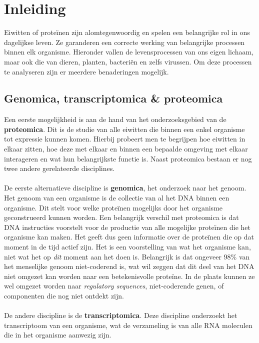 \chapter{Inleiding}\label{ch:introductie}

Eiwitten of proteïnen zijn alomtegenwoordig en spelen een belangrijke rol in ons dagelijkse leven.
Ze garanderen een correcte werking van belangrijke processen binnen elk organisme.
Hieronder vallen de levensprocessen van ons eigen lichaam, maar ook die van dieren, planten, bacteriën en zelfs virussen.
Om deze processen te analyseren zijn er meerdere benaderingen mogelijk.


\section{Genomica, transcriptomica \& proteomica}\label{sec:genomica-transcriptomica-&-proteomica}
Een eerste mogelijkheid is aan de hand van het onderzoeksgebied van de \textbf{proteomica}.
Dit is de studie van alle eiwitten die binnen een enkel organisme tot expressie kunnen komen.
Hierbij probeert men te begrijpen hoe eiwitten in elkaar zitten, hoe deze met elkaar en binnen een bepaalde omgeving met elkaar interageren en wat hun belangrijkste functie is.
Naast proteomica bestaan er nog twee andere gerelateerde disciplines.
\\ \\
De eerste alternatieve discipline is \textbf{genomica}, het onderzoek naar het genoom.
Het genoom van een organisme is de collectie van al het DNA binnen een organisme.
Dit stelt voor welke proteïnen mogelijks door het organisme geconstrueerd kunnen worden.
Een belangrijk verschil met proteomica is dat DNA instructies voorstelt voor de productie van alle mogelijke proteïnen die het organisme kan maken.
Het geeft dus geen informatie over de proteïnen die op dat moment in de tijd actief zijn.
Het is een voorstelling van wat het organisme kan, niet wat het op \textit{dit} moment aan het doen is.
Belangrijk is dat ongeveer 98\% van het menselijke genoom niet-coderend is, wat wil zeggen dat dit deel van het DNA niet omgezet kan worden naar een betekenisvolle proteïne.
In de plaats kunnen ze wel omgezet worden naar \textit{regulatory sequences}, niet-coderende genen, of componenten die nog niet ontdekt zijn.
\\ \\
De andere discipline is de \textbf{transcriptomica}.
Deze discipline onderzoekt het transcriptoom van een organisme, wat de verzameling is van alle RNA moleculen die in het organisme aanwezig zijn.
